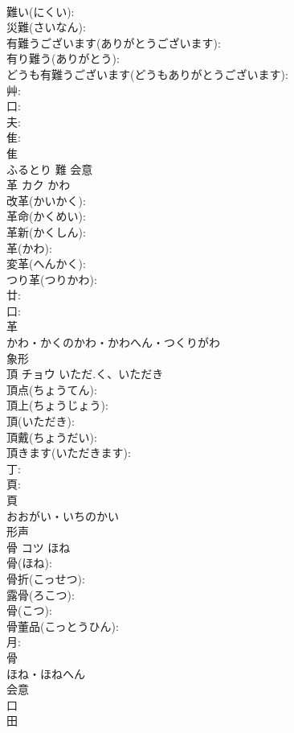 \documentclass[8pt]{extreport}
\begin{document}
\begin{CJK}{UTF8}{min}
\\	難い(にくい): 
\\	災難(さいなん): 
\\	有難うございます(ありがとうございます): 
\\	有り難う(ありがとう): 
\\	どうも有難うございます(どうもありがとうございます): 
\\	艸: 
\\	口: 
\\	夫: 
\\	隹: 
\\	隹	
\\	ふるとり	難	会意 
\\	革	カク	かわ		
\\	改革(かいかく): 
\\	革命(かくめい): 
\\	革新(かくしん): 
\\	革(かわ): 
\\	変革(へんかく): 
\\	つり革(つりかわ): 
\\	廿: 
\\	口: 
\\	革	
\\	かわ・かくのかわ・かわへん・つくりがわ	
\\	象形 
\\	頂	チョウ	いただ.く、いただき		
\\	頂点(ちょうてん): 
\\	頂上(ちょうじょう): 
\\	頂(いただき): 
\\	頂戴(ちょうだい): 
\\	頂きます(いただきます): 
\\	丁: 
\\	頁: 
\\	頁	
\\	おおがい・いちのかい	
\\	形声 
\\	骨	コツ	ほね		
\\	骨(ほね): 
\\	骨折(こっせつ): 
\\	露骨(ろこつ): 
\\	骨(こつ): 
\\	骨董品(こっとうひん): 
\\	月: 
\\	骨	
\\	ほね・ほねへん	
\\	会意 
\\	口 
\\	田 

\end{CJK}
\end{document}
